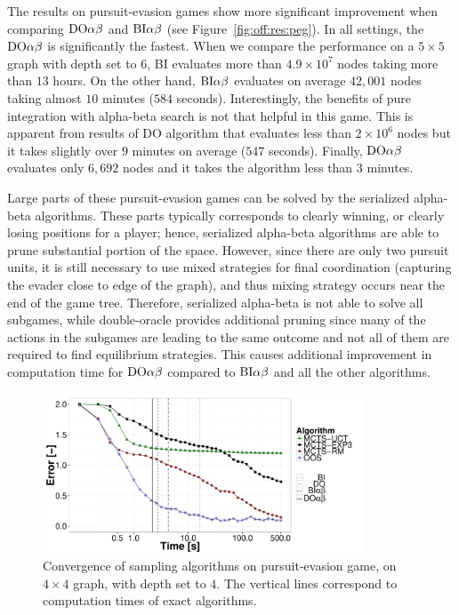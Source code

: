 The results on pursuit-evasion games show more significant improvement when comparing $\textrm{DO}\alpha\beta$ and $\textrm{BI}\alpha\beta$ (see Figure~\ref{fig:off:res:peg}). In all settings, the $\textrm{DO}\alpha\beta$ is significantly the fastest. When we compare the performance on a $5\times5$ graph with depth set to $6$, \textsc{BI} evaluates more than $4.9\times10^7$ nodes taking more than $13$ hours. On the other hand, $\textrm{BI}\alpha\beta$ evaluates on average $42,001$ nodes taking almost $10$ minutes ($584$ seconds). Interestingly, the benefits of pure integration with alpha-beta search is not that helpful in this game.
This is apparent from results of \textsc{DO} algorithm that evaluates less than $2\times10^6$ nodes but it takes slightly over $9$ minutes on average ($547$ seconds). Finally, $\textrm{DO}\alpha\beta$ evaluates only $6,692$ nodes and it takes the algorithm less than $3$ minutes.

Large parts of these pursuit-evasion games can be solved by the serialized alpha-beta algorithms.
These parts typically corresponds to clearly winning, or clearly losing positions for a player; hence, serialized alpha-beta algorithms are able to prune substantial portion of the space.
However, since there are only two pursuit units, it is still necessary to use mixed strategies for final coordination (capturing the evader close to edge of the graph), and thus mixing strategy occurs near the end of the game tree.
Therefore, serialized alpha-beta is not able to solve all subgames, while double-oracle provides additional pruning since many of the actions in the subgames are leading to the same outcome and not all of them are required to find equilibrium strategies.
This causes additional improvement in computation time for $\textrm{DO}\alpha\beta$ compared to $\textrm{BI}\alpha\beta$ and all the other algorithms.%

\begin{figure}[t!]
\centering
\includegraphics[width=0.85\textwidth]{figures/convergence-peg.pdf}
\caption{Convergence of sampling algorithms on pursuit-evasion game, on $4\times4$ graph, with depth set to $4$. The vertical lines correspond to computation times of exact algorithms.} \label{fig:off:conv:peg}
\end{figure}

